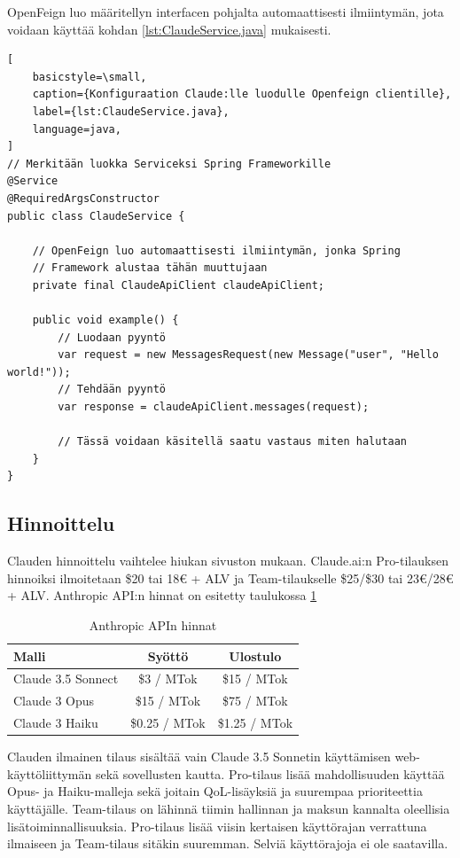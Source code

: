 OpenFeign luo määritellyn interfacen pohjalta automaattisesti ilmiintymän, jota
voidaan käyttää kohdan \ref{lst:ClaudeService.java} mukaisesti.

\begin{lstlisting}[
    basicstyle=\small,
    caption={Konfiguraation Claude:lle luodulle Openfeign clientille},
    label={lst:ClaudeService.java},
    language=java,
]
// Merkitään luokka Serviceksi Spring Frameworkille
@Service
@RequiredArgsConstructor
public class ClaudeService {

    // OpenFeign luo automaattisesti ilmiintymän, jonka Spring
    // Framework alustaa tähän muuttujaan
    private final ClaudeApiClient claudeApiClient;

    public void example() {
        // Luodaan pyyntö
        var request = new MessagesRequest(new Message("user", "Hello world!"));
        // Tehdään pyyntö
        var response = claudeApiClient.messages(request);

        // Tässä voidaan käsitellä saatu vastaus miten halutaan
    }
}
\end{lstlisting}

\subsection{Hinnoittelu}

Clauden hinnoittelu vaihtelee hiukan sivuston mukaan. Claude.ai:n Pro-tilauksen
hinnoiksi ilmoitetaan \$20 tai 18€ + ALV ja Team-tilaukselle \$25/\$30 tai
23€/28€ + ALV. \parencite{anthropicPricing} \parencite{claudePricing} Anthropic
API:n hinnat on esitetty taulukossa \ref{tab:anthropic-api-pricing}

\begin{table}[H]
  \centering
  \caption{Anthropic APIn hinnat}
  \label{tab:anthropic-api-pricing}
  \begin{tabular}{lcc}
    \textbf{Malli} & \textbf{Syöttö} & \textbf{Ulostulo} \\
    \hline
    Claude 3.5 Sonnect &    \$3 / MTok &   \$15 / MTok \\
    Claude 3 Opus      &   \$15 / MTok &   \$75 / MTok \\
    Claude 3 Haiku     & \$0.25 / MTok & \$1.25 / MTok \\
    \hline
  \end{tabular}
\end{table}

Clauden ilmainen tilaus sisältää vain Claude 3.5 Sonnetin käyttämisen web-
käyttöliittymän sekä sovellusten kautta. Pro-tilaus lisää mahdollisuuden
käyttää Opus- ja Haiku-malleja sekä joitain QoL-lisäyksiä ja suurempaa
prioriteettia käyttäjälle. Team-tilaus on lähinnä tiimin hallinnan ja maksun
kannalta oleellisia lisätoiminnallisuuksia. Pro-tilaus lisää viisin kertaisen
käyttörajan verrattuna ilmaiseen ja Team-tilaus sitäkin suuremman.
\parencite{anthropicPricing} \parencite{claudePricing} Selviä käyttörajoja ei
ole saatavilla.

